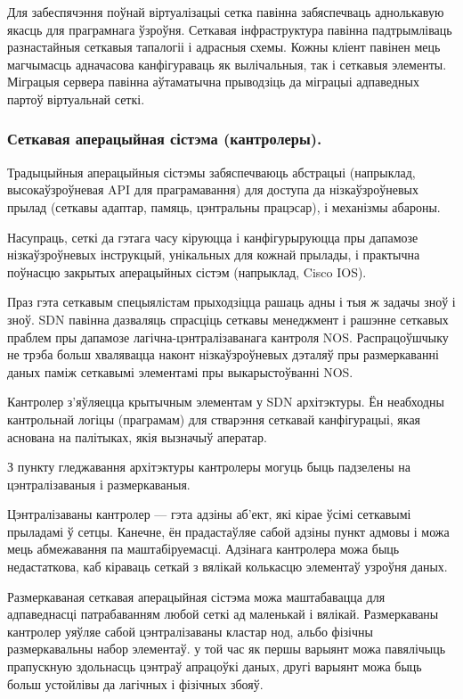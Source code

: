 Для забеспячэння поўнай віртуалізацыі сетка павінна забяспечваць аднолькавую якасць
для праграмнага ўзроўня. Сеткавая інфраструктура павінна падтрымліваць разнастайныя
сеткавыя тапалогіі і адрасныя схемы. Кожны кліент павінен мець магчымасць
адначасова канфігураваць як вылічальныя, так і сеткавыя элементы. Міграцыя сервера
павінна аўтаматычна прыводзіць да міграцыі адпаведных партоў віртуальнай сеткі.

\subsubsection{Сеткавая аперацыйная сістэма (кантролеры).}

Традыцыйныя аперацыйныя сістэмы забяспечваюць абстрацыі (напрыклад, высокаўзроўневая API для праграмавання) для доступа да нізкаўзроўневых прылад (сеткавы адаптар, памяць, цэнтральны працэсар), і механізмы абароны.

Насупраць, сеткі да гэтага часу кіруюцца і канфігурыруюцца пры дапамозе нізкаўзроўневых
інструкцый, унікальных для кожнай прылады, і практычна поўнасцю закрытых аперацыйных
сістэм (напрыклад, Cisco IOS).

Праз гэта сеткавым спецыялістам прыходзіцца рашаць адны і тыя ж задачы зноў і зноў.
SDN павінна дазваляць спрасціць сеткавы менеджмент і рашэнне сеткавых праблем
пры дапамозе лагічна-цэнтралізаванага кантроля NOS. Распрацоўшчыку не трэба
больш хвалявацца наконт нізкаўзроўневых дэталяў пры размеркаванні
даных паміж сеткавымі элементамі пры выкарыстоўванні NOS.

Кантролер з'яўляецца крытычным элементам у SDN архітэктуры. Ён неабходны кантрольнай
логіцы (праграмам) для стварэння сеткавай канфігурацыі, якая аснована на палітыках,
якія вызначыў аператар.

З пункту гледжавання архітэктуры кантролеры могуць быць падзелены на цэнтралізаваныя
і размеркаваныя.

Цэнтралізаваны кантролер --- гэта адзіны аб'ект, які кірае ўсімі сеткавымі прыладамі
ў сетцы. Канечне, ён прадастаўляе сабой адзіны пункт адмовы і можа мець абмежавання
па маштабіруемасці. Адзінага кантролера можа быць недастаткова, каб кіраваць
сеткай з вялікай колькасцю элементаў узроўня даных.

Размеркаваная сеткавая аперацыйная сістэма можа маштабавацца для адпаведнасці
патрабаванням любой сеткі ад маленькай і вялікай. Размеркаваны кантролер
уяўляе сабой цэнтралізаваны кластар нод, альбо фізічны размеркавальны набор элементаў.
у той час як першы варыянт можа павялічыць прапускную здольнасць цэнтраў апрацоўкі даных, другі варыянт можа быць больш устойлівы да лагічных і фізічных збояў.

